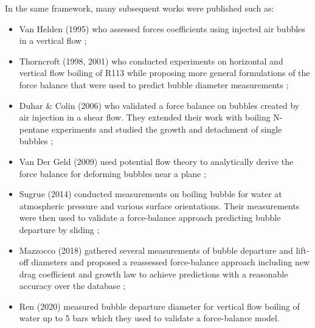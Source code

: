 \npar

In the same framework, many subsequent works were published such as:

\begin{itemize}
\item Van Helden \etal \cite{van_helden_forces_1995} (1995) who assessed forces coefficients using injected air bubbles in a vertical flow ;

\item Thorncroft \etal \cite{thorncroft_experimental_1998, thorncroft_bubble_2001} (1998, 2001) who conducted experiments on horizontal and vertical flow boiling of R113 while proposing more general formulations of the force balance that were used to predict bubble diameter measurements ;

\item Duhar \& Colin \cite{duhar_dynamics_2006} (2006) who validated a force balance on bubbles created by air injection in a shear flow. They extended their work with boiling N-pentane experiments and studied the growth and detachment of single bubbles  \cite{duhar_npentane} ;

\item Van Der Geld (2009) \cite{van_der_geld_dynamics_2009} used potential flow theory to analytically derive the force balance for deforming bubbles near a plane ;

\item Sugrue \etal (2014) \cite{sugrue_experimental_2014} conducted measurements on boiling bubble for water at atmospheric pressure and various surface orientations. Their measurements were then used to validate a force-balance approach predicting bubble departure by sliding \cite{sugrue_modified_2016} ;

\item Mazzocco \etal (2018) \cite{mazzocco_reassessed_2018} gathered several measurements of bubble departure and lift-off diameters and proposed a reassessed force-balance approach including new drag coefficient and growth law to achieve predictions with a reasonable accuracy over the database ;

\item Ren \etal (2020) \cite{ren_development_2020} measured bubble departure diameter for vertical flow boiling of water up to 5 bars which they used to validate a force-balance model.
\end{itemize}

